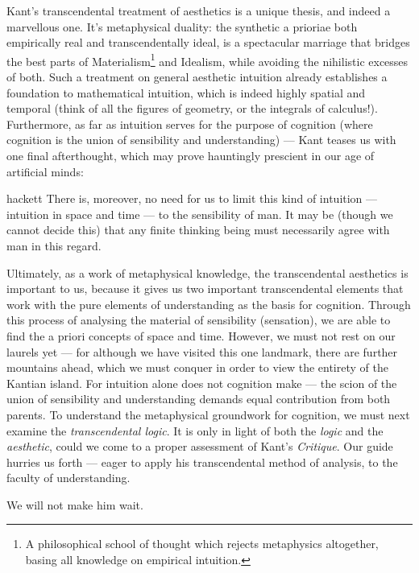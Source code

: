 Kant's transcendental treatment of aesthetics is a unique thesis, and indeed a marvellous one. It's metaphysical duality: the synthetic a prioriae both empirically real and transcendentally ideal, is a spectacular marriage that bridges the best parts of Materialism\footnote{A philosophical school of thought which rejects metaphysics altogether, basing all knowledge on empirical intuition.} and Idealism, while avoiding the nihilistic excesses of both. Such a treatment on general aesthetic intuition already establishes a foundation to mathematical intuition, which is indeed highly spatial and temporal (think of all the figures of geometry, or the integrals of calculus!). Furthermore, as far as intuition serves for the purpose of cognition (where cognition is the union of sensibility and understanding) --- Kant teases us with one final afterthought, which may prove hauntingly prescient in our age of artificial minds:

\begin{displaycquote}[B72]{hackett}
  There is, moreover, no need for us to limit this kind of intuition --- intuition in space and time --- to the sensibility of man. It may be (though we cannot decide this) that any finite thinking being must necessarily agree with man in this regard.
\end{displaycquote}

\noindent
Ultimately, as a work of metaphysical knowledge, the transcendental aesthetics is important to us, because it gives us two important transcendental elements that work with the pure elements of understanding as the basis for cognition. Through this process of analysing the material of sensibility (sensation), we are able to find the a priori concepts of space and time. However, we must not rest on our laurels yet --- for although we have visited this one landmark, there are further mountains ahead, which we must conquer in order to view the entirety of the Kantian island. For intuition alone does not cognition make --- the scion of the union of sensibility and understanding demands equal contribution from both parents. To understand the metaphysical groundwork for cognition, we must next examine the \emph{transcendental logic}. It is only in light of both the \emph{logic} and the \emph{aesthetic}, could we come to a proper assessment of Kant's \emph{Critique}. Our guide hurries us forth --- eager to apply his transcendental method of analysis, to the faculty of understanding.

\noindent
We will not make him wait.

